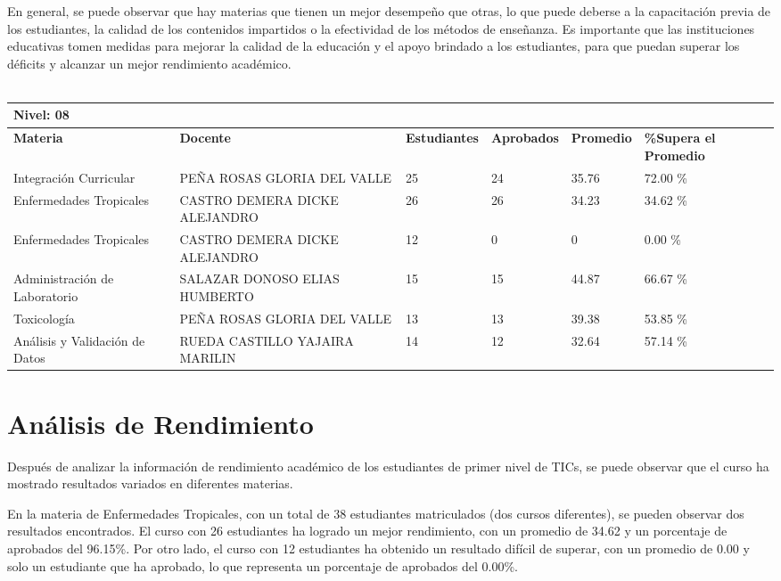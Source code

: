 En general, se puede observar que hay materias que tienen un mejor desempeño que otras, lo que puede deberse a la capacitación previa de los estudiantes, la calidad de los contenidos impartidos o la efectividad de los métodos de enseñanza. Es importante que las instituciones educativas tomen medidas para mejorar la calidad de la educación y el apoyo brindado a los estudiantes, para que puedan superar los déficits y alcanzar un mejor rendimiento académico.\\
\vspace{1cm}\\\small
\begin{tabularx}{\textwidth}{|p{2.5cm}|p{2.5cm}|X|X|X|X|}
\hline
\multicolumn{6}{|X|}{\textbf{Nivel: 08 }}\\\hline\textbf{Materia} & \textbf{Docente} & \textbf{Estudiantes} & \textbf{Aprobados} & \textbf{Promedio} & \textbf{\%Supera el Promedio} \\ \hline
Integración Curricular & PEÑA ROSAS GLORIA DEL VALLE & 25 & 24 & 35.76 & 72.00 \%\\ \hline
Enfermedades Tropicales & CASTRO DEMERA DICKE ALEJANDRO & 26 & 26 & 34.23 & 34.62 \%\\ \hline
Enfermedades Tropicales & CASTRO DEMERA DICKE ALEJANDRO & 12 & 0 & 0 & 0.00 \%\\ \hline
Administración de Laboratorio & SALAZAR DONOSO ELIAS HUMBERTO & 15 & 15 & 44.87 & 66.67 \%\\ \hline
Toxicología & PEÑA ROSAS GLORIA DEL VALLE & 13 & 13 & 39.38 & 53.85 \%\\ \hline
Análisis y Validación de Datos & RUEDA CASTILLO YAJAIRA MARILIN & 14 & 12 & 32.64 & 57.14 \%\\ \hline
\end{tabularx}

\vspace{1cm}
\section{Análisis de Rendimiento}
Después de analizar la información de rendimiento académico de los estudiantes de primer nivel de TICs, se puede observar que el curso ha mostrado resultados variados en diferentes materias.

En la materia de Enfermedades Tropicales, con un total de 38 estudiantes matriculados (dos cursos diferentes), se pueden observar dos resultados encontrados. El curso con 26 estudiantes ha logrado un mejor rendimiento, con un promedio de 34.62 y un porcentaje de aprobados del 96.15\%. Por otro lado, el curso con 12 estudiantes ha obtenido un resultado difícil de superar, con un promedio de 0.00 y solo un estudiante que ha aprobado, lo que representa un porcentaje de aprobados del 0.00\%.

